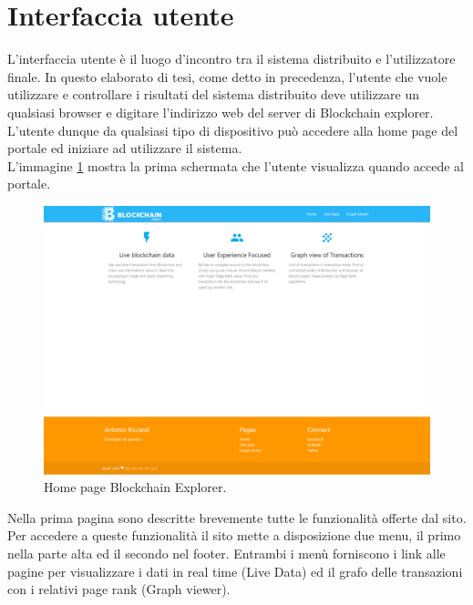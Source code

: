 \section{Interfaccia utente}
\label{sec:userInterface}
L'interfaccia utente è il luogo d'incontro tra il sistema distribuito e l'utilizzatore finale. In questo elaborato di tesi, come detto in precedenza, l'utente che vuole utilizzare e controllare i risultati del sistema distribuito deve utilizzare un qualsiasi browser e digitare l'indirizzo web del server di Blockchain explorer. L'utente dunque da qualsiasi tipo di dispositivo può accedere alla home page del portale ed iniziare ad utilizzare il sistema.
\\L'immagine \ref{fig:homePage} mostra la prima schermata che l'utente visualizza quando accede al portale.
\begin{figure}[H]
	\centering
	\includegraphics[width=\textwidth, height=0.60\textheight]{images/homePage.png}
	\caption{Home page Blockchain Explorer.}
	\label{fig:homePage}
\end{figure}
Nella prima pagina sono descritte brevemente tutte le funzionalità offerte dal sito. Per accedere a queste funzionalità il sito mette a disposizione due menu, il primo nella parte alta ed il secondo nel footer. Entrambi i menù forniscono i link alle pagine per visualizzare i dati in real time (Live Data) ed il grafo delle transazioni con i relativi page rank (Graph viewer).
